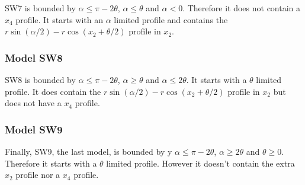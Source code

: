 SW7 is bounded by $\alpha \le \pi - 2\theta$, $\alpha \le \theta$ and $\alpha < 0$. Therefore it does not contain a $x_4$ profile. It starts with an $\alpha$ limited profile and contains the $r\sin(\alpha/2) - r\cos(x_2 + \theta/2)$ profile in $x_2$.




\subsubsection{Model SW8} \label{SW8}

SW8 is bounded by $\alpha \le \pi - 2\theta$, $\alpha \ge \theta$ and $\alpha \le 2\theta$. It starts with a $\theta$ limited profile. It does contain the $r\sin(\alpha/2) - r\cos(x_2 + \theta/2)$ profile in $x_2$ but does not have a $x_4$ profile.



\begin{comment}
\begin{figure}[t]
\centering
\texttt{[image: /home/tim/Dropbox/liz-paper/lucasMoorcroftManuscript/supplementary-material/imgs/equalModelResults.pdf]}
\caption[REM model solutions]{The results of the models grouped so that all the regions with equal results are presented only once.}
\label{f:equalModelResults}
\end{figure}
\end{comment}

\subsubsection{Model SW9} \label{SW9}

Finally, SW9, the last model, is bounded by y $\alpha \le \pi - 2\theta$, $\alpha \ge 2\theta$ and $\theta \ge 0$. Therefore it starts with a $\theta$ limited profile. However it doesn't contain the extra $x_2$ profile nor a $x_4$ profile.








